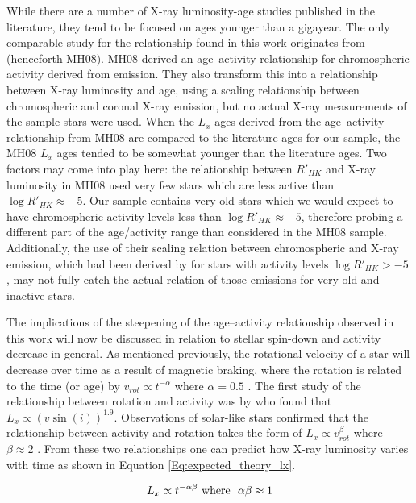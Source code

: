 While there are a number of X-ray luminosity-age studies published in the literature, they tend to be focused on ages younger than a gigayear. The only comparable study for the relationship found in this work originates from \citet{Mamajek_Hillenbrand_2008} (henceforth MH08). MH08 derived an age--activity relationship for chromospheric activity derived from \caII emission. They also transform this into a relationship between X-ray luminosity and age, using a scaling relationship between chromospheric \caII and coronal X-ray emission, but no actual X-ray measurements of the sample stars were used. When the $L_{x}$ ages derived from the age--activity relationship from MH08 are compared to the literature ages for our sample, the MH08 $L_{x}$ ages tended to be somewhat younger than the literature ages. Two factors may come into play here: the relationship between $R'_{HK}$ and X-ray luminosity in MH08 used very few stars which are less active than $\log R'_{HK} \approx -5$. Our sample contains very old stars which we would expect to have chromospheric activity levels less than  $\log R'_{HK} \approx -5$, therefore probing a different part of the age/activity range than considered in the MH08 sample. Additionally, the use of their scaling relation between chromospheric and X-ray emission, which had been derived by \citet{Sterzik_Schmitt_1997} for stars with activity levels $\log R'_{HK} > -5$ , may not fully catch the actual relation of those emissions for very old and inactive stars.

The implications of the steepening of the age--activity relationship observed in this work will now be discussed in relation to stellar spin-down and activity decrease in general. As mentioned previously, the rotational velocity of a star will decrease over time as a result of magnetic braking, where the rotation is related to the time (or age) by $v_{rot} \propto t^{-\alpha}$ where $\alpha = 0.5$ \citep{Skumanich_1972,Meibom_etal_2011}. The first study of the relationship between rotation and activity was by \citealp{Pallavicini_etal_1981} who found that $L_{x} \propto (v\sin(i))^{1.9}$. Observations of solar-like stars confirmed that the relationship between activity and rotation takes the form of $L_{x} \propto v_{rot}^{\beta}$ where $\beta \approx 2$ \citep{Pizzolato_etal_2003}. From these two relationships one can predict how X-ray luminosity varies with time as shown in Equation \ref{Eq:expected_theory_lx}.

\begin{equation}
	L_{x} \propto t^{-\alpha\beta} \text{\space where \space} \alpha\beta \approx 1
	\label{Eq:expected_theory_lx}
\end{equation}

